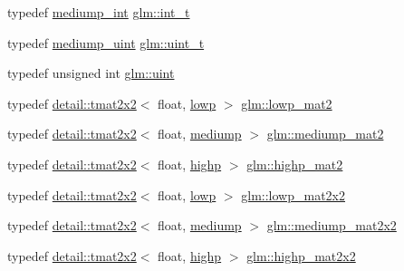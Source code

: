 \begin{DoxyCompactItemize}
\item 
typedef \hyperlink{group__core__precision_ga2a3dcbcd7f4e17663d393a12061ac6ac}{mediump\+\_\+int} \hyperlink{group__core__precision_gacd01d170508f812968875b0f2e730e8c}{glm\+::int\+\_\+t}
\item 
typedef \hyperlink{group__core__precision_ga08ae38ad78ade3539fdd1d25052b8c51}{mediump\+\_\+uint} \hyperlink{group__core__precision_ga5f2ae871c284c9d39ae8fdbb1305b566}{glm\+::uint\+\_\+t}
\item 
typedef unsigned int \hyperlink{group__core__precision_ga4fd29415871152bfb5abd588334147c8}{glm\+::uint}
\item 
typedef \hyperlink{structglm_1_1detail_1_1tmat2x2}{detail\+::tmat2x2}$<$ float, \hyperlink{namespaceglm_a0f04f086094c747d227af4425893f545ae161af3fc695e696ce3bf69f7332bc2d}{lowp} $>$ \hyperlink{group__core__precision_gac0acc3ccf8da050af3393ea639f698d6}{glm\+::lowp\+\_\+mat2}
\item 
typedef \hyperlink{structglm_1_1detail_1_1tmat2x2}{detail\+::tmat2x2}$<$ float, \hyperlink{namespaceglm_a0f04f086094c747d227af4425893f545a6416f3ea0c9025fb21ed50c4d6620482}{mediump} $>$ \hyperlink{group__core__precision_ga6ed8bfa67b72cea216cb558411f95f86}{glm\+::mediump\+\_\+mat2}
\item 
typedef \hyperlink{structglm_1_1detail_1_1tmat2x2}{detail\+::tmat2x2}$<$ float, \hyperlink{namespaceglm_a0f04f086094c747d227af4425893f545ac6f7eab42eacbb10d59a58e95e362074}{highp} $>$ \hyperlink{group__core__precision_gab9884251d84b95dbbf27aa1e4b3a1ec7}{glm\+::highp\+\_\+mat2}
\item 
typedef \hyperlink{structglm_1_1detail_1_1tmat2x2}{detail\+::tmat2x2}$<$ float, \hyperlink{namespaceglm_a0f04f086094c747d227af4425893f545ae161af3fc695e696ce3bf69f7332bc2d}{lowp} $>$ \hyperlink{group__core__precision_ga7d7e123d953978cc17de6882bb10400e}{glm\+::lowp\+\_\+mat2x2}
\item 
typedef \hyperlink{structglm_1_1detail_1_1tmat2x2}{detail\+::tmat2x2}$<$ float, \hyperlink{namespaceglm_a0f04f086094c747d227af4425893f545a6416f3ea0c9025fb21ed50c4d6620482}{mediump} $>$ \hyperlink{group__core__precision_ga867b486aea2d228a1e1a134af73b2c4b}{glm\+::mediump\+\_\+mat2x2}
\item 
typedef \hyperlink{structglm_1_1detail_1_1tmat2x2}{detail\+::tmat2x2}$<$ float, \hyperlink{namespaceglm_a0f04f086094c747d227af4425893f545ac6f7eab42eacbb10d59a58e95e362074}{highp} $>$ \hyperlink{group__core__precision_ga694146b8d430b22caa8b37571d9bc8bc}{glm\+::highp\+\_\+mat2x2}
\item 

\end{DoxyCompactItemize}
